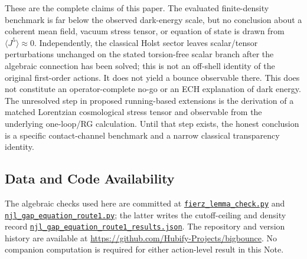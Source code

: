 \documentclass[aps,prd,twocolumn,superscriptaddress,showpacs,preprintnumbers,nofootinbib,longbibliography,floatfix]{revtex4-2}
\newcommand{\artifactnamed}[2]{\href{https://github.com/Hubify-Projects/bigbounce/blob/main/#1}{\nolinkurl{#2}}}
\begin{document}
These are the complete claims of this paper.  The evaluated finite-density
benchmark is far below the observed dark-energy scale, but no conclusion about
a coherent mean field, vacuum stress tensor, or equation of state is drawn
from $\langle J^5\rangle\approx0$.  Independently, the classical Holst sector
leaves scalar/tensor perturbations unchanged on the stated torsion-free scalar
branch after the algebraic connection has been solved; this is not an off-shell
identity of the original first-order actions.  It does not yield a bounce
observable there.  This does not constitute
an operator-complete no-go or an ECH explanation of dark energy.  The unresolved
step in proposed running-based extensions is the derivation of a matched
Lorentzian cosmological stress tensor and observable from the underlying
one-loop/RG calculation.  Until that step exists, the honest conclusion is a
specific contact-channel benchmark and a narrow classical transparency
identity.

\subsection*{Data and Code Availability}

The algebraic checks used here are committed at
\artifactnamed{arxiv/scripts/fierz_lemma_check.py}{fierz_lemma_check.py} and
\artifactnamed{arxiv/scripts/njl_gap_equation_route1.py}{njl_gap_equation_route1.py}; the latter writes the
cutoff-ceiling and density record
\artifactnamed{arxiv/scripts/njl_gap_equation_route1_results.json}{njl_gap_equation_route1_results.json}.  The repository and
version history are available at
\url{https://github.com/Hubify-Projects/bigbounce}.  No companion computation is
required for either action-level result in this Note.

\appendix
\end{document}
